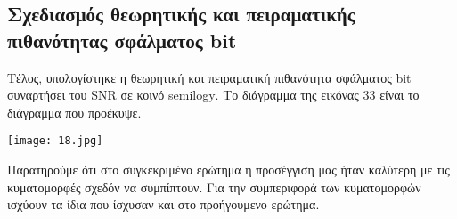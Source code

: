 \documentclass[11pt]{article}
\begin{document}
\subsection{Σχεδιασμός θεωρητικής και πειραματικής πιθανότητας σφάλματος \foreignlanguage{english}{bit}}

Τέλος, υπολογίστηκε η θεωρητική και πειραματική πιθανότητα σφάλματος \foreignlanguage{english}{bit} συναρτήσει του \foreignlanguage{english}{SNR} σε κοινό \foreignlanguage{english}{semilogy}. Το διάγραμμα της εικόνας 33 είναι το διάγραμμα που προέκυψε.

\begin{center}
	\texttt{[image: 18.jpg]}
\end{center}

Παρατηρούμε ότι στο συγκεκριμένο ερώτημα η προσέγγιση μας ήταν καλύτερη με τις κυματομορφές σχεδόν να συμπίπτουν. Για την συμπεριφορά των κυματομορφών ισχύουν τα ίδια που ίσχυσαν και στο προήγουμενο ερώτημα.
\end{document}
